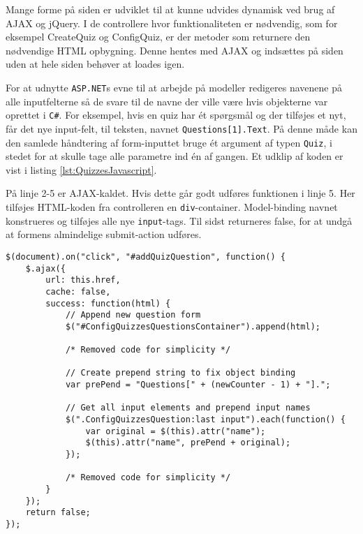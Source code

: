 Mange forme på siden er udviklet til at kunne udvides dynamisk ved brug af AJAX og jQuery. I de controllere hvor funktionaliteten er nødvendig, som for eksempel CreateQuiz og ConfigQuiz, er der metoder som returnere den nødvendige HTML opbygning. Denne hentes med AJAX og indsættes på siden uden at hele siden behøver at loades igen.

For at udnytte \verb+ASP.NET+s evne til at arbejde på modeller redigeres navenene på alle inputfelterne så de svare til de navne der ville være hvis objekterne var oprettet i \verb+C#+.
For eksempel, hvis en quiz har ét spørgsmål og der tilføjes et nyt, får det nye input-felt, til teksten, navnet \verb+Questions[1].Text+.
På denne måde kan den samlede håndtering af form-inputtet bruge ét argument af typen \verb+Quiz+, i stedet for at skulle tage alle parametre ind én af gangen. Et udklip af koden er vist i listing \ref{lst:QuizzesJavascript}.

På linje 2-5 er AJAX-kaldet. Hvis dette går godt udføres funktionen i linje 5. Her tilføjes HTML-koden fra controlleren en \verb+div+-container. Model-binding navnet konstrueres og tilføjes alle nye \verb+input+-tags. Til sidst returneres false, for at undgå at formens almindelige submit-action udføres.

\begin{lstlisting}[caption=JavaScript udklip til AJAX og model-binding håndtering ved indsættelse af nye spørgsmål, label=lst:QuizzesJavascript]
$(document).on("click", "#addQuizQuestion", function() {
    $.ajax({
        url: this.href,
        cache: false,
        success: function(html) {
            // Append new question form
            $("#ConfigQuizzesQuestionsContainer").append(html);

            /* Removed code for simplicity */
			
            // Create prepend string to fix object binding
            var prePend = "Questions[" + (newCounter - 1) + "].";

            // Get all input elements and prepend input names
            $(".ConfigQuizzesQuestion:last input").each(function() {
                var original = $(this).attr("name");
                $(this).attr("name", prePend + original);
            });
            
            /* Removed code for simplicity */
        }
    });
    return false;
});
\end{lstlisting}